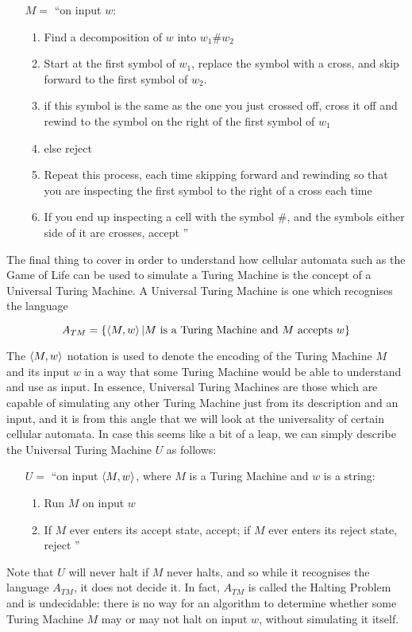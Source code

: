 \documentclass[11pt,a4paper]{article}
\newenvironment{turing}[2]{
    \begin{enumerate}[leftmargin=0pt,labelsep=0pt,align=left,parsep=0pt]
        \item[$#1={}$]``\ignorespaces#2
            \begin{enumerate}[
                nosep,
                align=left,
                labelwidth=1.5em,
                label=\bfseries\arabic{*}.,
                ref=\arabic{*}
            ]}{\unskip''
            \end{enumerate}
    \end{enumerate}}
\newcommand{\bitem}{\item\hspace*{1em}\ignorespaces}
\begin{document}
    \begin{turing}{M}{on input $w$:}
        \item Find a decomposition of $w$ into $w_1 \# w_2$
        \item Start at the first symbol of $w_1$, replace the symbol with a
            cross, and skip forward to the first symbol of $w_2$.
            \bitem if this symbol is the same as the one you just crossed off,
            cross it off and rewind to the symbol on the right of the first
            symbol of $w_1$
            \bitem else reject
        \item Repeat this process, each time skipping forward and rewinding so
            that you are inspecting the first symbol to the right of a cross
            each time
        \item If you end up inspecting a cell with the symbol $\#$, and the
            symbols either side of it are crosses, accept
    \end{turing}

    The final thing to cover in order to understand how cellular automata such
    as the Game of Life can be used to simulate a Turing Machine is the concept
    of a Universal Turing Machine. A Universal Turing Machine is one which
    recognises the language

    $$A_{TM} = \{\braket{M,w} | M \text{ is a Turing Machine and } M
    \text{ accepts } w\} $$

    The $\braket{M,w}$ notation is used to denote the encoding of the Turing
    Machine $M$ and its input $w$ in a way that some Turing Machine would be
    able to understand and use as input. In essence, Universal Turing Machines
    are those which are capable of simulating any other Turing Machine just from
    its description and an input, and it is from this angle that we will look at
    the universality of certain cellular automata. In case this seems like a bit
    of a leap, we can simply describe the Universal Turing Machine $U$ as
    follows:

    \begin{turing}{U}{on input $\braket{M,w}$, where $M$ is a Turing Machine and
        $w$ is a string:}
        \item Run $M$ on input $w$
        \item If $M$ ever enters its accept state, accept; if $M$ ever enters
            its reject state, reject
    \end{turing}

    Note that $U$ will never halt if $M$ never halts, and so while it recognises
    the language $A_{TM}$, it does not decide it. In fact, $A_{TM}$ is called
    the Halting Problem and is undecidable: there is no way for an algorithm to
    determine whether some Turing Machine $M$ may or may not halt on input $w$,
    without simulating it itself.
\end{document}
